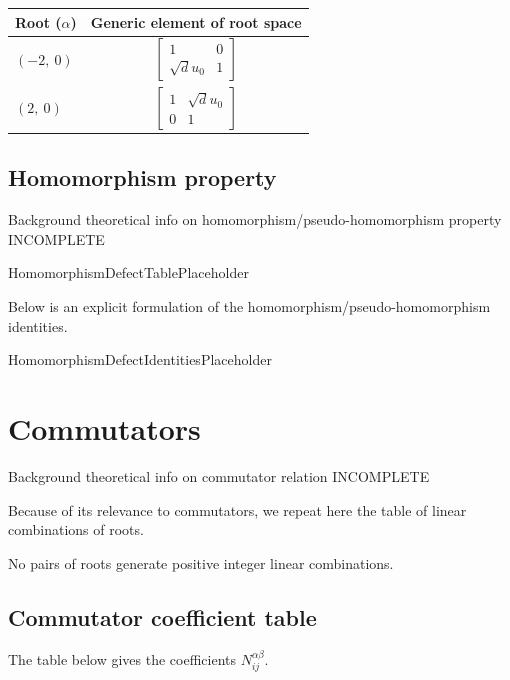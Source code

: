 \documentclass[11pt]{article}
\newcommand{\noi}{\noindent}
\theoremstyle{definition}
\begin{document}
\bigskip

\noindent \begin{tabular}{|l|c|}
    \hline
    \textbf{Root ($\alpha$)} & \textbf{Generic element of root space} \\
    \hline
    $\left( -2, \  0\right)$ & $\left[\begin{matrix}1 & 0\\\sqrt{d} u_{0} & 1\end{matrix}\right]$ \\
    \hline
    $\left( 2, \  0\right)$ & $\left[\begin{matrix}1 & \sqrt{d} u_{0}\\0 & 1\end{matrix}\right]$ \\
    \hline
\end{tabular}


\subsection{Homomorphism property}

\noi Background theoretical info on homomorphism/pseudo-homomorphism property INCOMPLETE

\bigskip

HomomorphismDefectTablePlaceholder

\noi Below is an explicit formulation of the homomorphism/pseudo-homomorphism identities.

\bigskip

HomomorphismDefectIdentitiesPlaceholder

\newpage
\section{Commutators}

\noi Background theoretical info on commutator relation INCOMPLETE

\noi Because of its relevance to commutators, we repeat here the table of linear combinations of roots.

\noindent No pairs of roots generate positive integer linear combinations.


\subsection{Commutator coefficient table}

\noi The table below gives the coefficients $N_{ij}^{\alpha\beta}$.
\end{document}
